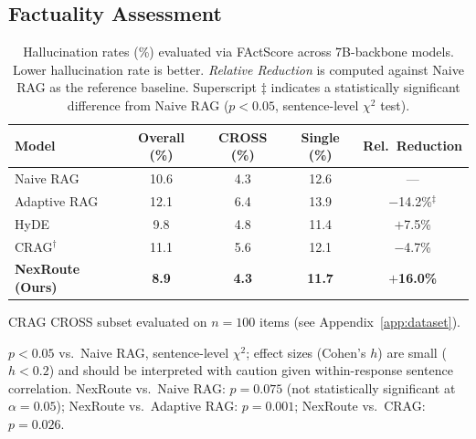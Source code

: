 \documentclass[a4paper,fleql]{cas-sc}
\begin{document}
\subsection{Factuality Assessment}
\label{sec:factuality}
\begin{table}[t]
\centering
\caption{Hallucination rates (\%) evaluated via FActScore across 7B-backbone models.
  Lower hallucination rate is better.
  \textit{Relative Reduction} is computed against Naive RAG as the reference baseline.
  Superscript $\ddagger$ indicates a statistically significant difference from Naive RAG
  ($p < 0.05$, sentence-level $\chi^2$ test).}
\label{tab:factscore_baselines}
\setlength{\tabcolsep}{8pt}
\begin{tabular}{lcccc}
\toprule
\textbf{Model}
  & \textbf{Overall (\%)}
  & \textbf{CROSS (\%)}
  & \textbf{Single (\%)}
  & \textbf{Rel.\ Reduction} \\
\midrule
Naive RAG         & 10.6 & 4.3 & 12.6 & ---                  \\
Adaptive RAG      & 12.1 & 6.4 & 13.9 & $-$14.2\%$^\ddagger$ \\
HyDE              &  9.8 & 4.8 & 11.4 & $+$7.5\%              \\
CRAG$^\dagger$    & 11.1 & 5.6 & 12.1 & $-$4.7\%              \\
\textbf{NexRoute (Ours)} & \textbf{8.9} & \textbf{4.3} & \textbf{11.7}
  & $\boldsymbol{+}$\textbf{16.0\%} \\
\bottomrule
\end{tabular}
\begin{tablenotes}[flushleft]\footnotesize
  \item[$\dagger$] CRAG CROSS subset evaluated on $n{=}100$ items
    (see Appendix~\ref{app:dataset}).
  \item[$\ddagger$] $p < 0.05$ vs.\ Naive RAG, sentence-level $\chi^2$; effect
    sizes (Cohen's $h$) are small ($h < 0.2$) and should be interpreted
    with caution given within-response sentence correlation.
    NexRoute vs.\ Naive RAG: $p{=}0.075$ (not statistically significant at
    $\alpha{=}0.05$); NexRoute vs.\ Adaptive RAG: $p{=}0.001$;
    NexRoute vs.\ CRAG: $p{=}0.026$.
\end{tablenotes}
\end{table}
\end{document}
